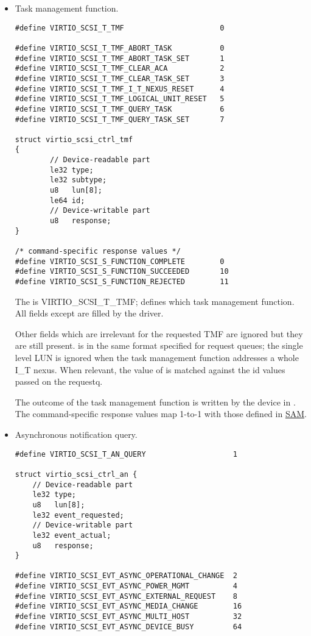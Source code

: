 \begin{itemize}
\item Task management function.
\begin{lstlisting}
#define VIRTIO_SCSI_T_TMF                      0

#define VIRTIO_SCSI_T_TMF_ABORT_TASK           0
#define VIRTIO_SCSI_T_TMF_ABORT_TASK_SET       1
#define VIRTIO_SCSI_T_TMF_CLEAR_ACA            2
#define VIRTIO_SCSI_T_TMF_CLEAR_TASK_SET       3
#define VIRTIO_SCSI_T_TMF_I_T_NEXUS_RESET      4
#define VIRTIO_SCSI_T_TMF_LOGICAL_UNIT_RESET   5
#define VIRTIO_SCSI_T_TMF_QUERY_TASK           6
#define VIRTIO_SCSI_T_TMF_QUERY_TASK_SET       7

struct virtio_scsi_ctrl_tmf
{
        // Device-readable part
        le32 type;
        le32 subtype;
        u8   lun[8];
        le64 id;
        // Device-writable part
        u8   response;
}

/* command-specific response values */
#define VIRTIO_SCSI_S_FUNCTION_COMPLETE        0
#define VIRTIO_SCSI_S_FUNCTION_SUCCEEDED       10
#define VIRTIO_SCSI_S_FUNCTION_REJECTED        11
\end{lstlisting}

  The  is VIRTIO_SCSI_T_TMF;  defines which
  task management function. All
  fields except  are filled by the driver.

  Other fields which are irrelevant for the requested TMF
  are ignored but they are still present. 
  is in the same format specified for request queues; the
  single level LUN is ignored when the task management function
  addresses a whole I_T nexus. When relevant, the value of 
  is matched against the id values passed on the requestq.

  The outcome of the task management function is written by the
  device in . The command-specific response
  values map 1-to-1 with those defined in \hyperref[intro:SAM]{SAM}.

\item Asynchronous notification query.
\begin{lstlisting}
#define VIRTIO_SCSI_T_AN_QUERY                    1

struct virtio_scsi_ctrl_an {
    // Device-readable part
    le32 type;
    u8   lun[8];
    le32 event_requested;
    // Device-writable part
    le32 event_actual;
    u8   response;
}

#define VIRTIO_SCSI_EVT_ASYNC_OPERATIONAL_CHANGE  2
#define VIRTIO_SCSI_EVT_ASYNC_POWER_MGMT          4
#define VIRTIO_SCSI_EVT_ASYNC_EXTERNAL_REQUEST    8
#define VIRTIO_SCSI_EVT_ASYNC_MEDIA_CHANGE        16
#define VIRTIO_SCSI_EVT_ASYNC_MULTI_HOST          32
#define VIRTIO_SCSI_EVT_ASYNC_DEVICE_BUSY         64
\end{lstlisting}


\end{itemize}

